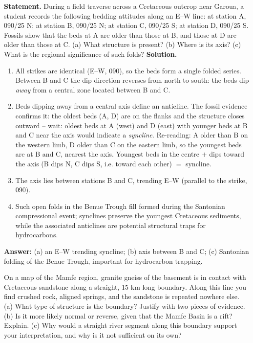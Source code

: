 \documentclass[11pt]{article}
\newcommand{\cle}[1]{{\popxbold\color{popdark}#1}}
\begin{document}
\begin{exoresolu}
\textbf{Statement.} During a field traverse across a Cretaceous outcrop near Garoua, a student records the following bedding attitudes along an E--W line: at station A, 090/25 N; at station B, 090/25 N; at station C, 090/25 S; at station D, 090/25 S. Fossils show that the beds at A are older than those at B, and those at D are older than those at C. (a) What structure is present? (b) Where is its axis? (c) What is the regional significance of such folds?
\tcblower
\textbf{Solution.}
\begin{enumerate}
\item All strikes are identical (E--W, 090), so the beds form a single folded series. Between B and C the dip direction reverses from north to south: the beds dip \emph{away} from a central zone located between B and C.
\item Beds dipping away from a central axis define an \cle{anticline}. The fossil evidence confirms it: the oldest beds (A, D) are on the flanks and the structure closes outward -- wait: oldest beds at A (west) and D (east) with younger beds at B and C near the axis would indicate a \emph{syncline}. Re-reading: A older than B on the western limb, D older than C on the eastern limb, so the youngest beds are at B and C, nearest the axis. Youngest beds in the centre $+$ dips toward the axis (B dips N, C dips S, i.e. toward each other) $=$ \cle{syncline}.
\item The axis lies between stations B and C, trending E--W (parallel to the strike, 090).
\item Such open folds in the Benue Trough fill formed during the Santonian compressional event; synclines preserve the youngest Cretaceous sediments, while the associated anticlines are potential structural traps for hydrocarbons.
\end{enumerate}
\textbf{Answer:} (a) an E--W trending syncline; (b) axis between B and C; (c) Santonian folding of the Benue Trough, important for hydrocarbon trapping.
\end{exoresolu}

\begin{exercice}
On a map of the Mamfe region, granite gneiss of the basement is in contact with Cretaceous sandstone along a straight, 15 km long boundary. Along this line you find crushed rock, aligned springs, and the sandstone is repeated nowhere else. (a) What type of structure is the boundary? Justify with two pieces of evidence. (b) Is it more likely normal or reverse, given that the Mamfe Basin is a rift? Explain. (c) Why would a straight river segment along this boundary support your interpretation, and why is it not sufficient on its own?
\end{exercice}
\end{document}
